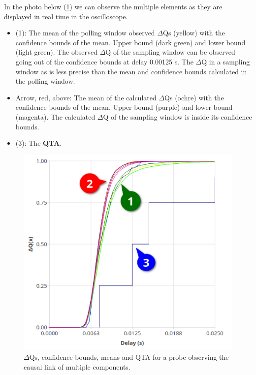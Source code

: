     In the photo below (\cref{fig:dq_displ}) we can observe the multiple elements as they are displayed in real time in the oscilloscope.
    \begin{itemize}
        \item (1): The mean of the polling window observed $\Delta$Qs (yellow) with the confidence bounds of the mean. Upper bound (dark green) and lower bound (light green). The observed $\Delta$Q of the sampling window can be observed going out of the confidence bounds at delay 0.00125 s. The $\Delta$Q in a sampling window as is less precise than the mean and confidence bounds calculated in the polling window.
        \item Arrow, red, above: The mean of the calculated $\Delta$Qs (ochre) with the confidence bounds of the mean. Upper bound (purple) and lower bound (magenta). The calculated $\Delta$Q of the sampling window is inside its confidence bounds.
        \item (3): The \textbf{QTA}.
    \end{itemize}
     \begin{figure}[H]
        \begin{center}
            \includegraphics[scale = 0.7]{img/overload_2/fired_sampleb.png}
        \end{center}
         \caption{$\Delta$Qs, confidence bounds, means and QTA for a probe observing the causal link of multiple components.}
         \label{fig:dq_displ}
    \end{figure}
        

